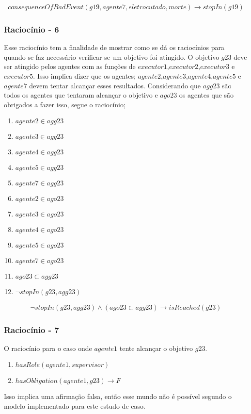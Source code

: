 \begin{eqnarray}
	consequenceOfBadEvent(g19,agente7,eletrocutado,morte) \to stopIn(g19)
\end{eqnarray}


\subsubsection{Raciocínio - 6}
\label{raciocinio6}
Esse raciocínio tem a finalidade de mostrar como se dá os raciocínios para quando se faz necessário verificar se um objetivo foi atingido. O objetivo $g23$ deve ser atingido pelos agentes com as funções de $executor1$,$executor2$,$executor3$ e $executor5$. Isso implica dizer que os agentes; $agente2$,$agente3$,$agente4$,$agente5$ e $agente7$ devem tentar alcançar esses resultados. Considerando que $agg23$ são todos os agentes que tentaram alcançar o objetivo e $ago23$ os agentes que são obrigados a fazer isso, segue o raciocínio;


\begin{enumerate}
	\item $agente2 \in agg23$	
	\item $agente3 \in agg23$
	\item $agente4 \in agg23$
	\item $agente5 \in agg23$
	\item $agente7 \in agg23$								
	\item $agente2 \in ago23$	
	\item $agente3 \in ago23$
	\item $agente4 \in ago23$
	\item $agente5 \in ago23$
	\item $agente7 \in ago23$	
	\item $ago23 \subset agg23$
	\item $\neg stopIn(g23,agg23)$										
\end{enumerate}

\begin{eqnarray}\label{rel15}
	\neg stopIn(g23,agg23) \wedge (ago23 \subset agg23) \to isReached(g23)
\end{eqnarray}

\subsubsection{Raciocínio - 7}
\label{raciocinio7}
O raciocínio para o caso onde $agente1$ tente alcançar o objetivo $g23$.  

\begin{enumerate}
	\item $hasRole(agente1,supervisor)$
	\item $hasObligation(agente1,g23) \to F$										
\end{enumerate}

Isso implica uma afirmação falsa, então esse mundo não é possível segundo o modelo implementado para este estudo de caso.